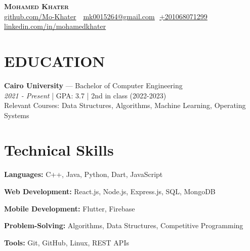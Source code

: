 \documentclass[letterpaper,11pt]{article}
\begin{document}
\begin{flushright}
  \vspace{-4pt}
\end{flushright}

\vspace{-7pt}



\begin{center}
    \textbf{\Huge \scshape Mohamed Khater} \\ \vspace{8pt}
    \small 
    \faGithub
    \href{https://github.com/Mo-Khater}{\underline{github.com/Mo-Khater}} $  $
    \faEnvelope$  $
    \href{mailto:mk0015264@gmail.com}
    {\underline{mk0015264@gmail.com}}
    \faPhone$  $
    \underline{+201068071299}
    \faLinkedin$  $
    \href{https://www.linkedin.com/in/mohamed-khater-924782243/}{\underline{linkedin.com/in/mohamedkhater}} $  $
\end{center}

\section{EDUCATION}
\begin{itemize}[leftmargin=0.15in, label={}]
    \normalsize{\item{
        \textbf{Cairo University}{ --- Bachelor of Computer Engineering} \\ 
        \textit{2021 - Present} | GPA: 3.7 | 2nd in class (2022-2023) \\ 
        Relevant Courses: Data Structures, Algorithms, Machine Learning, Operating Systems
    }}
\end{itemize}

\section{Technical Skills}
\begin{itemize}
  \small{\item \textbf{Languages:} C++, Java, Python, Dart, JavaScript}
  \small{\item \textbf{Web Development:} React.js, Node.js, Express.js, SQL, MongoDB}
  \small{\item \textbf{Mobile Development:} Flutter, Firebase}
  \small{\item \textbf{Problem-Solving:} Algorithms, Data Structures, Competitive Programming}
  \small{\item \textbf{Tools:} Git, GitHub, Linux, REST APIs}
\end{itemize}
\end{document}
